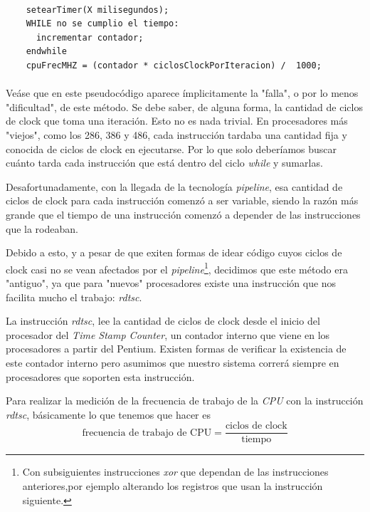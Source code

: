 \documentclass[a4paper,10pt]{article}
\begin{document}
    \paragraph*{}
    \begin{lstlisting}
    setearTimer(X milisegundos);
    WHILE no se cumplio el tiempo:
	  incrementar contador;
    endwhile
    cpuFrecMHZ = (contador * ciclosClockPorIteracion) /  1000;
    \end{lstlisting}
    \paragraph*{}
    Veáse que en este pseudocódigo aparece ímplicitamente la "falla", o por lo menos "dificultad", de este método. Se debe saber, de alguna forma, la cantidad de ciclos
    de clock que toma una iteración. Esto no es nada trivial. En procesadores más "viejos", como los 286, 386 y 486, cada instrucción tardaba una cantidad fija y conocida
    de ciclos de clock en ejecutarse. Por lo que solo deberíamos buscar cuánto tarda cada instrucción que está dentro  del ciclo \textit{while} y sumarlas.

    Desafortunadamente, con la llegada de la tecnología \textit{pipeline}, esa cantidad de ciclos de clock para cada instrucción comenzó a ser variable, siendo la 
    razón más grande que el tiempo de una instrucción comenzó a depender de las instrucciones que la rodeaban.

    Debido a esto, y a pesar de que exiten formas de idear código cuyos ciclos de clock casi no se vean afectados por el \textit{pipeline}\footnote{ Con 
    subsiguientes instrucciones \textit{xor} que dependan de las instrucciones anteriores,por ejemplo alterando los registros que usan la instrucción siguiente.}, 
    decidimos que este método era "antiguo", ya que para "nuevos" procesadores existe una instrucción que nos facilita mucho el trabajo: \textit{rdtsc}.

    La instrucción \textit{rdtsc}, lee la cantidad de ciclos de clock desde el inicio del procesador del \textit{Time Stamp Counter}, un contador interno que viene
    en los procesadores a partir del Pentium. Existen formas de verificar la existencia de este contador interno pero asumimos que nuestro sistema correrá siempre en
    procesadores que soporten esta instrucción.

    Para realizar la medición de la frecuencia de trabajo de la \textit{CPU} con la instrucción \textit{rdtsc}, básicamente lo que tenemos que hacer es 
    \[  \text{frecuencia de trabajo de CPU} = \dfrac{\text{ciclos de clock}}{\text{tiempo}} \]
    
\end{document}
